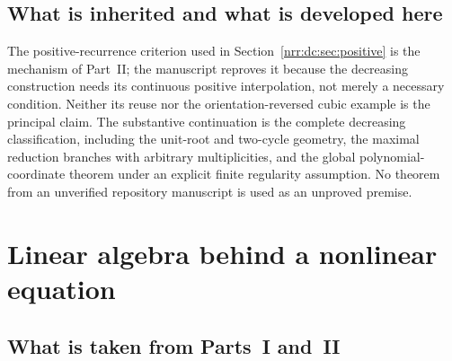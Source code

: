 \documentclass[11pt,letterpaper]{article}
\theoremstyle{definition}
\theoremstyle{remark}
\begin{document}
\subsection{What is inherited and what is developed here}

The positive-recurrence criterion used in Section~\ref{nrr:dc:sec:positive}
is the mechanism of Part~II; the manuscript reproves it because the decreasing
construction needs its continuous positive interpolation, not merely a
necessary condition. Neither its reuse nor the orientation-reversed cubic
example is the principal claim. The substantive continuation is the complete
decreasing classification, including the unit-root and two-cycle geometry,
the maximal reduction branches with arbitrary multiplicities, and the global
polynomial-coordinate theorem under an explicit finite regularity assumption.
No theorem from an unverified repository manuscript is used as an unproved
premise.

\section{Linear algebra behind a nonlinear equation}
\label{nrr:dc:sec:recurrences}

\subsection{What is taken from Parts~I and~II}
\label{nrr:dc:sec:imported}
\end{document}
